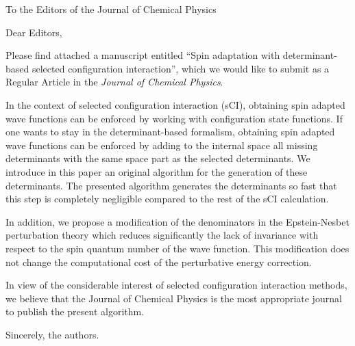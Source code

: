 \documentclass[10pt]{letter}
\begin{document}
\begin{letter}%
{To the Editors of the Journal of Chemical Physics}

\opening{Dear Editors,}

Please find attached a manuscript entitled
``Spin adaptation with determinant-based selected configuration interaction'', which
we would like to submit as a Regular Article in the \textit{Journal of Chemical Physics}.

In the context of selected configuration interaction (sCI), obtaining spin
adapted wave functions can be enforced by working with configuration state
functions.  If one wants to stay in the determinant-based formalism, obtaining
spin adapted wave functions can be enforced by adding to the internal space all
missing determinants with the same space part as the selected determinants.  We
introduce in this paper an original algorithm for the generation of these
determinants.  The presented algorithm generates the determinants so fast that
this step is completely negligible compared to the rest of the sCI calculation.

In addition, we propose a modification of the denominators in the Epstein-Nesbet
perturbation theory which reduces significantly the lack of invariance 
with respect to the spin quantum number of the wave function. This modification
does not change the computational cost of the perturbative energy correction.

In view of the considerable interest of selected configuration interaction 
methods, we believe that the Journal of Chemical Physics is
the most appropriate journal to publish the present algorithm.

\closing{Sincerely, the authors.}
\end{letter}
\end{document}
